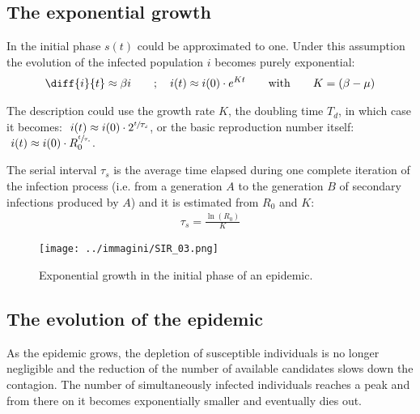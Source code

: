 \documentclass[DIV=12, BCOR=0pt]{scrartcl}  %
\begin{document}
  
  \subsection{The exponential growth}
  In the initial phase $s(t)$ could be approximated to one. %
  Under this assumption the evolution of the infected population $i$ becomes purely exponential:
  \begin{align}
  	\diff{i}{t} \approx  \beta i \qquad;\quad 	i(t) \approx i(0) \cdot e^{K t} \qquad \mathrm{with} \qquad K = (\beta - \mu)
  \end{align}
	
	The description could use the growth rate $K$, the doubling time $T_{d}$, in which case it becomes: $\ i(t) \approx i(0) \cdot 2^{\sfrac{t}{T_{d}}}$, or the basic reproduction number itself: $\ i(t) \approx i(0) \cdot R_{0}^{\sfrac{t}{\tau_{s}}}$.
	
	
	The serial interval $\tau_{s}$ is the average time elapsed during one complete iteration of the infection process (i.e. from a generation $A$ to the generation $B$ of secondary infections produced by $A$) and it is estimated from $R_{0}$ and $K$: 
	\begin{align}
		\tau_{s} = \frac{\ln(R_{0})}{K}
	\end{align}
	
	
  
  \begin{figure}[h]
  	\centering
  	\texttt{[image: ../immagini/SIR\_03.png]}
  	\caption{Exponential growth in the initial phase of an epidemic. }
  	\label{fig:SIRexp}
  \end{figure}
  
  
  
  \subsection{The evolution of the epidemic}
  As the epidemic grows, the depletion of susceptible individuals is no longer negligible and the reduction of the number of available candidates slows down the contagion. The number of simultaneously infected individuals reaches a peak and from there on it becomes exponentially smaller and eventually dies out.
  
\end{document}

